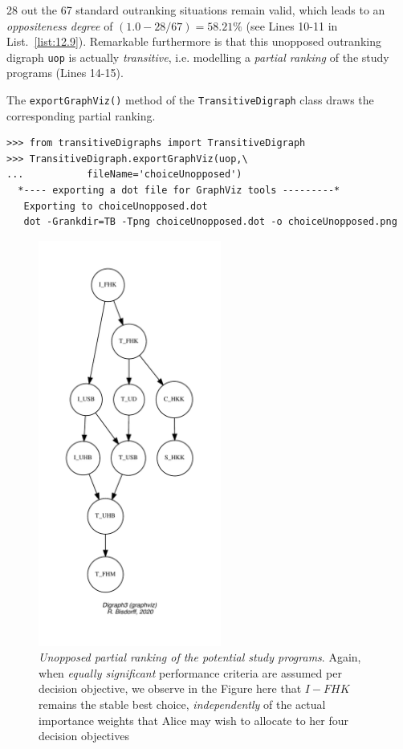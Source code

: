 28 out the 67 standard outranking situations remain valid, which leads to an \emph{oppositeness degree} of $(1.0 - 28/67) = 58.21\%$ (see Lines 10-11 in List.~\vref{list:12.9}). Remarkable furthermore is that this unopposed outranking digraph \texttt{uop} is actually \emph{transitive}, i.e. modelling a \emph{partial ranking} of the study programs (Lines 14-15).

The \texttt{exportGraphViz()} method of the \texttt{Transi\-tiveDigraph} class draws the corresponding partial ranking.
\begin{lstlisting}
>>> from transitiveDigraphs import TransitiveDigraph
>>> TransitiveDigraph.exportGraphViz(uop,\
...           fileName='choiceUnopposed')
  *---- exporting a dot file for GraphViz tools ---------*
   Exporting to choiceUnopposed.dot
   dot -Grankdir=TB -Tpng choiceUnopposed.dot -o choiceUnopposed.png
\end{lstlisting}
\begin{figure}[ht]
\sidecaption[t]
\includegraphics[width=6cm]{Figures/12-7-choiceUnopposed.pdf}
\caption[Unopposed partial ranking of the potential study programs]{\emph{Unopposed partial ranking of the potential study programs}. Again, when \emph{equally significant} performance criteria are assumed per decision objective, we observe in the Figure here that $I-FHK$ remains the stable best choice, \emph{independently} of the actual importance weights that Alice may wish to allocate to her four decision objectives}
\label{fig:12.7}       %
\end{figure}

